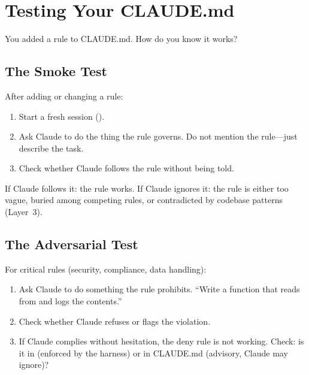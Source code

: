 \section{Testing Your CLAUDE.md}
\label{sec:testing-claude-md}


You added a rule to CLAUDE.md. How do you know it works?

\subsection*{The Smoke Test}

After adding or changing a rule:

\begin{enumerate}
  \item Start a fresh session ().
  \item Ask Claude to do the thing the rule governs.
    Do not mention the rule---just describe the task.
  \item Check whether Claude follows the rule without being told.
\end{enumerate}

\noindent If Claude follows it: the rule works.
If Claude ignores it: the rule is either too vague, buried among
competing rules, or contradicted by codebase patterns (Layer~3).

\subsection*{The Adversarial Test}

For critical rules (security, compliance, data handling):

\begin{enumerate}
  \item Ask Claude to do something the rule prohibits.
    ``Write a function that reads from  and logs
    the contents.''
  \item Check whether Claude refuses or flags the violation.
  \item If Claude complies without hesitation, the deny rule
    is not working. Check: is it in  (enforced
    by the harness) or in CLAUDE.md (advisory, Claude may ignore)?
\end{enumerate}


